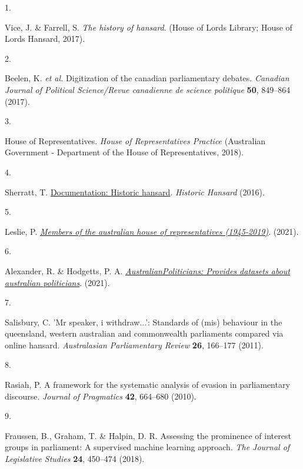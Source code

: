 \documentclass[
  letterpaper,
  DIV=11,
  numbers=noendperiod]{scrartcl}
\newlength{\cslhangindent}
\newlength{\csllabelwidth}
\newlength{\cslentryspacingunit} %
\newenvironment{CSLReferences}[2] %
 {%
  \setlength{\parindent}{0pt}
  \ifodd #1
  \let\oldpar\par
  \def\par{\hangindent=\cslhangindent\oldpar}
  \fi
  \setlength{\parskip}{#2\cslentryspacingunit}
 }%
 {}
\newcommand{\CSLLeftMargin}[1]{\parbox[t]{\csllabelwidth}{#1}}
\newcommand{\CSLRightInline}[1]{\parbox[t]{\linewidth - \csllabelwidth}{#1}\break}
\begin{document}
\hypertarget{refs}{}
\begin{CSLReferences}{0}{0}
\leavevmode{}%
\CSLLeftMargin{1. }%
\CSLRightInline{Vice, J. \& Farrell, S. \emph{The history of hansard}.
(House of Lords Library; House of Lords Hansard, 2017).}

\leavevmode{}%
\CSLLeftMargin{2. }%
\CSLRightInline{Beelen, K. \emph{et al.} Digitization of the canadian
parliamentary debates. \emph{Canadian Journal of Political Science/Revue
canadienne de science politique} \textbf{50}, 849--864 (2017).}

\leavevmode{}%
\CSLLeftMargin{3. }%
\CSLRightInline{House of Representatives. \emph{{House of
Representatives Practice}} ({Australian Government - Department of the
House of Representatives}, 2018).}

\leavevmode{}%
\CSLLeftMargin{4. }%
\CSLRightInline{Sherratt, T.
\href{http://timsherratt.org/digital-heritage-handbook/docs/historic-hansard/\#}{Documentation:
Historic hansard}. \emph{Historic Hansard} (2016).}

\leavevmode{}%
\CSLLeftMargin{5. }%
\CSLRightInline{Leslie, P.
\emph{\href{https://github.com/palesl/AustralianHouseOfRepresentatives}{Members
of the australian house of representatives (1945-2019)}}. (2021).}

\leavevmode{}%
\CSLLeftMargin{6. }%
\CSLRightInline{Alexander, R. \& Hodgetts, P. A.
\emph{\href{https://CRAN.R-project.org/package=AustralianPoliticians}{AustralianPoliticians:
Provides datasets about australian politicians}}. (2021).}

\leavevmode{}%
\CSLLeftMargin{7. }%
\CSLRightInline{Salisbury, C. 'Mr speaker, i withdraw...': Standards of
(mis) behaviour in the queensland, western australian and commonwealth
parliaments compared via online hansard. \emph{Australasian
Parliamentary Review} \textbf{26}, 166--177 (2011).}

\leavevmode{}%
\CSLLeftMargin{8. }%
\CSLRightInline{Rasiah, P. A framework for the systematic analysis of
evasion in parliamentary discourse. \emph{Journal of Pragmatics}
\textbf{42}, 664--680 (2010).}

\leavevmode{}%
\CSLLeftMargin{9. }%
\CSLRightInline{Fraussen, B., Graham, T. \& Halpin, D. R. Assessing the
prominence of interest groups in parliament: A supervised machine
learning approach. \emph{The Journal of Legislative Studies}
\textbf{24}, 450--474 (2018).}


\end{CSLReferences}
\end{document}
